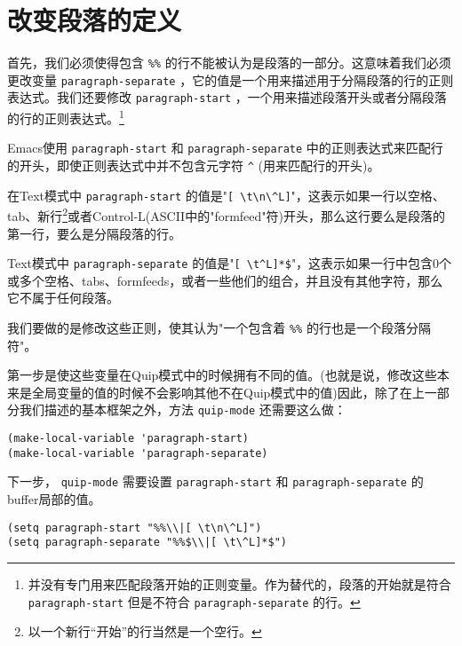 \section{改变段落的定义}
\label{section:09-Changing-the-Definition-of-a-Paragraph}

首先，我们必须使得包含 \verb|%%| 的行不能被认为是段落的一部分。这意味着我们必须更改变量 \texttt{paragraph-separate} ，它的值是一个用来描述用于分隔段落的行的正则表达式。我们还要修改 \texttt{paragraph-start} ，一个用来描述段落开头或者分隔段落的行的正则表达式。\footnote{并没有专门用来匹配段落开始的正则变量。作为替代的，段落的开始就是符合 \texttt{paragraph-start} 但是不符合 \texttt{paragraph-separate} 的行。}

Emacs使用 \texttt{paragraph-start} 和 \texttt{paragraph-separate} 中的正则表达式来匹配行的开头，即使正则表达式中并不包含元字符 \verb|^| (用来匹配行的开头)。

在Text模式中 \texttt{paragraph-start} 的值是"\verb|[ \t\n\^L]|"，这表示如果一行以空格、tab、新行\footnote{以一个新行“开始”的行当然是一个空行。}或者Control-L(ASCII中的"formfeed"符)开头，那么这行要么是段落的第一行，要么是分隔段落的行。

Text模式中 \texttt{paragraph-separate} 的值是"\verb|[ \t^L]*$|"，这表示如果一行中包含0个或多个空格、tabs、formfeeds，或者一些他们的组合，并且没有其他字符，那么它不属于任何段落。

我们要做的是修改这些正则，使其认为"一个包含着 \verb|%%| 的行也是一个段落分隔符"。

第一步是使这些变量在Quip模式中的时候拥有不同的值。(也就是说，修改这些本来是全局变量的值的时候不会影响其他不在Quip模式中的值)因此，除了在上一部分我们描述的基本框架之外，方法 \texttt{quip-mode} 还需要这么做：

\begin{verbatim}
(make-local-variable 'paragraph-start)
(make-local-variable 'paragraph-separate)
\end{verbatim}

下一步， \texttt{quip-mode} 需要设置 \texttt{paragraph-start} 和 \texttt{paragraph-separate} 的buffer局部的值。

\begin{verbatim}
(setq paragraph-start "%%\\|[ \t\n\^L]")
(setq paragraph-separate "%%$\\|[ \t\^L]*$")
\end{verbatim}

